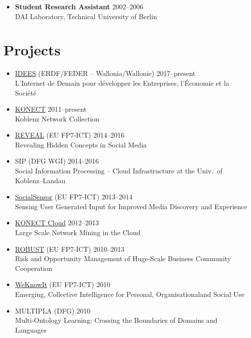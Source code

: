 \documentclass[line,mm]{res}
\newcounter{x}
\newcounter{y}
\begin{document}
\begin{resume}
\begin{itemize}
\item[]
\textbf{Student Research Assistant} \hfill 2002--2006 \\
DAI Laboratory, Technical University of Berlin 

\end{itemize}

\section{Projects}
\begin{itemize}
\item 
  \href{http://nouvelles.unamur.be/upnews.2015-10-01.8995593781}{IDEES} (ERDF/FEDER -- Wallonia/Wallonie) \hfill 2017--present \\
  L'Internet de Demain pour développer les Entreprises, l'Économie et la Société 
\item \href{http://konect.uni-koblenz.de/}{KONECT} \hfill 2011--present \\
  Koblenz Network Collection
\item \href{http://revealproject.eu/}{REVEAL} (EU FP7-ICT) \hfill 2014--2016 \\
  Revealing Hidden Concepts in Social Media
\item SIP (DFG WGI) \hfill 2014--2016 \\
  Social Information Processing -- Cloud Infrastructure at the Univ.\ of Koblenz--Landau
\item \href{http://www.socialsensor.eu/}{SocialSensor} (EU FP7-ICT) \hfill 2013--2014 \\
  Sensing User Generated Input for Improved Media Discovery and Experience
\item \href{https://books.google.be/books?id=06fDCQAAQBAJ&pg=PA107}{KONECT Cloud} \hfill 2012--2013 \\
  Large Scale Network Mining in the Cloud
\item \href{http://www.robust-project.eu/}{ROBUST} (EU FP7-ICT) \hfill 2010--2013 \\
  Risk and Opportunity Management of Huge-Scale Business Community Cooperation 
\item \href{http://www.weknowit.eu/}{WeKnowIt} (EU FP7-ICT) \hfill 2010 \\
   Emerging, Collective Intelligence for Personal, Organisationaland Social Use
\item MULTIPLA (DFG) \hfill 2010 \\
  Multi-Ontology Learning:  Crossing the Boundaries of Domains and Languages

\end{itemize}
\end{resume}
\end{document}
